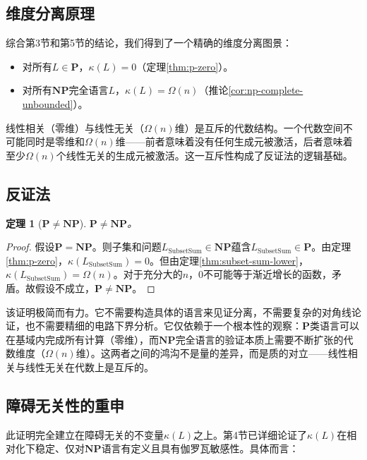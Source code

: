 \documentclass{ctexart}
\newtheorem{theorem}{定理}[section]
\newtheorem{proof}[theorem]{证明}
\begin{document}
	\subsection{维度分离原理}
	
	综合第3节和第5节的结论，我们得到了一个精确的维度分离图景：
	\begin{itemize}
		\item 对所有$L \in \mathbf{P}$，$\kappa(L) = 0$（定理\ref{thm:p-zero}）。
		\item 对所有$\mathbf{NP}$完全语言$L$，$\kappa(L) = \Omega(n)$（推论\ref{cor:np-complete-unbounded}）。
	\end{itemize}
	
	线性相关（零维）与线性无关（$\Omega(n)$维）是互斥的代数结构。一个代数空间不可能同时是零维和$\Omega(n)$维——前者意味着没有任何生成元被激活，后者意味着至少$\Omega(n)$个线性无关的生成元被激活。这一互斥性构成了反证法的逻辑基础。
	
	\subsection{反证法}
	
	\begin{theorem}[$\mathbf{P} \neq \mathbf{NP}$]\label{thm:pnp}
		$\mathbf{P} \neq \mathbf{NP}$。
	\end{theorem}
	\begin{proof}
		假设$\mathbf{P} = \mathbf{NP}$。则子集和问题$L_{\mathrm{SubsetSum}} \in \mathbf{NP}$蕴含$L_{\mathrm{SubsetSum}} \in \mathbf{P}$。由定理\ref{thm:p-zero}，$\kappa(L_{\mathrm{SubsetSum}}) = 0$。但由定理\ref{thm:subset-sum-lower}，$\kappa(L_{\mathrm{SubsetSum}}) = \Omega(n)$。对于充分大的$n$，$0$不可能等于渐近增长的函数，矛盾。故假设不成立，$\mathbf{P} \neq \mathbf{NP}$。
	\end{proof}
	
	该证明极简而有力。它不需要构造具体的语言来见证分离，不需要复杂的对角线论证，也不需要精细的电路下界分析。它仅依赖于一个根本性的观察：$\mathbf{P}$类语言可以在基域内完成所有计算（零维），而$\mathbf{NP}$完全语言的验证本质上需要不断扩张的代数维度（$\Omega(n)$维）。这两者之间的鸿沟不是量的差异，而是质的对立——线性相关与线性无关在代数上是互斥的。
	
	\subsection{障碍无关性的重申}
	
	此证明完全建立在障碍无关的不变量$\kappa(L)$之上。第4节已详细论证了$\kappa(L)$在相对化下稳定、仅对$\mathbf{NP}$语言有定义且具有伽罗瓦敏感性。具体而言：
	
\end{document}
